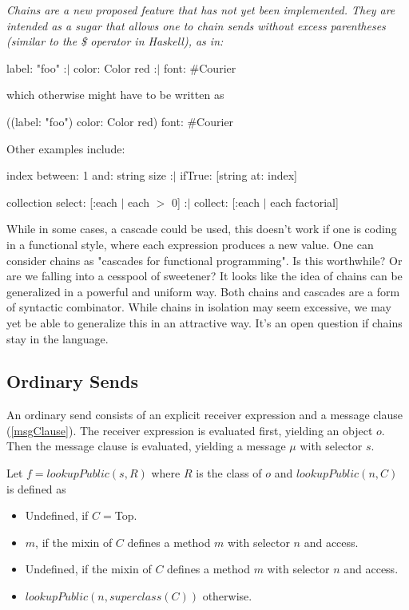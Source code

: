 \documentclass{article}
\newcommand{\code}[1]{{\sf #1}}
\begin{document}
{\it
Chains are a new proposed feature that has not yet been implemented. They are intended as a sugar that allows one to chain sends without excess parentheses (similar to the \$ operator in Haskell), as in:

\code{label: "foo" :$|$ color: Color red :$|$ font: \#Courier}

which otherwise might have to be written as

\code{((label: "foo") color: Color red) font: \#Courier}

Other examples include:

\code{index between: 1 and: string size :$|$ ifTrue: [string at: index]}

\code{ collection select: [:each $|$ each $>$ 0] :$|$ collect: [:each $|$ each factorial]}

While in some cases, a cascade could be used, this doesn't work if one is coding in a functional style, where each expression produces a new value. One can consider chains as "cascades for functional programming".
Is this worthwhile? Or are we falling into a cesspool of sweetener? It looks like the idea of chains can be generalized in a powerful and uniform way. Both chains and cascades are a form of syntactic combinator. While chains in isolation may seem excessive, we may yet be able to generalize this in an attractive way. It's an open question if chains stay in the language.
}



\subsection{Ordinary Sends}
\label{normal}

An ordinary send consists of an explicit receiver expression and a message clause (\ref{msgClause}). The receiver expression is evaluated first, yielding an object $o$. Then the message clause is evaluated, yielding a message $\mu$ with selector $s$.

Let $f = lookupPublic(s, R)$ where $R$ is the class of $o$ and $lookupPublic(n, C)$ is defined as
\begin{itemize}
\item Undefined, if $C =$\code{Top}.
\item $m$, if the mixin of $C$ defines a method $m$ with selector $n$ and \PUBLIC{} access.
\item Undefined, if the mixin of $C$ defines a method $m$ with selector $n$ and \PROTECTED{} access.
\item $lookupPublic(n, superclass(C))$ otherwise.
\end{itemize}
\end{document}
